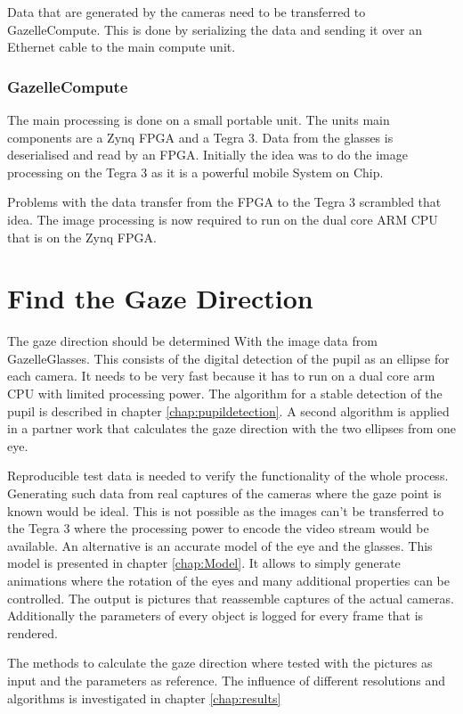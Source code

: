 Data that are generated by the cameras need to be transferred to GazelleCompute. This is done by serializing the data and sending it over an Ethernet cable to the main compute unit.
\subsubsection{GazelleCompute}
The main processing is done on a small portable unit. The units main components are a Zynq FPGA and a Tegra 3. Data from the glasses is deserialised and read by an FPGA. Initially the idea was to do the image processing on the Tegra 3 as it is a powerful mobile System on Chip.

Problems with the data transfer from the FPGA to the Tegra 3 scrambled that idea. The image processing is now required to run on the dual core ARM CPU that is on the Zynq FPGA.

\section{Find the Gaze Direction}
The gaze direction should be determined With the image data from GazelleGlasses. This consists of the digital detection of the pupil as an ellipse for each camera. It needs to be very fast because it has to run on a dual core arm CPU with limited processing power. The algorithm for a stable detection of the pupil is described in chapter \ref{chap:pupildetection}. A second algorithm is applied in a partner work that calculates the gaze direction with the two ellipses from one eye. 

Reproducible test data is needed to verify the functionality of the whole process. Generating such data from real captures of the cameras where the gaze point is known would be ideal. This is not possible as the images can't be transferred to the Tegra 3 where the processing power to encode the video stream would be available. An alternative is an accurate model of the eye and the glasses. This model is presented in chapter \ref{chap:Model}. It allows to simply generate animations where the rotation of the eyes and many additional properties can be controlled. The output is pictures that reassemble captures of the actual cameras. Additionally the parameters of every object is logged for every frame that is rendered.

The methods to calculate the gaze direction where tested with the pictures as input and the parameters as reference. The influence of different resolutions and algorithms is investigated in chapter \ref{chap:results}


